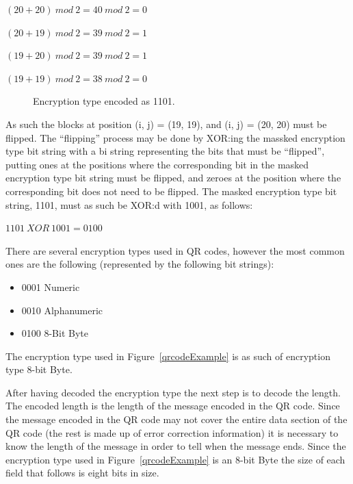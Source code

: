 \begin{center}

\((20+20)~mod~2=40~mod~2=0\)

\((20+19)~mod~2=39~mod~2=1\)

\((19+20)~mod~2=39~mod~2=1\)

\((19+19)~mod~2=38~mod~2=0\)

\end{center}

	\begin{figure}[H]%
		\centering
		\caption{Encryption type encoded as 1101.}
		\label{qrcodeExampleStep4}
	\end{figure}

As such the blocks at position (i, j) = (19, 19), and (i, j) = (20, 20) must be flipped. The ``flipping'' process may be done by XOR:ing the massked encryption type bit string with a bi string representing the bits that must be ``flipped'', putting ones at the positions where the corresponding bit in the masked encryption type bit string must be flipped, and zeroes at the position where the corresponding bit does not need to be flipped. The masked encryption type bit string, 1101, must as such be XOR:d with 1001, as follows:

\begin{center}
\(1101~XOR~1001=0100\)
\end{center}

There are several encryption types used in QR codes, however the most common ones are the following (represented by the following bit strings):

\begin{itemize}
	\item 0001 Numeric
	\item 0010 Alphanumeric
	\item 0100 8-Bit Byte
\end{itemize}

The encryption type used in Figure~\ref{qrcodeExample} is as such of encryption type 8-bit Byte.

After having decoded the encryption type the next step is to decode the length. The encoded length is the length of the message encoded in the QR code. Since the message encoded in the QR code may not cover the entire data section of the QR code (the rest is made up of error correction information) it is necessary to know the length of the message in order to tell when the message ends. Since the encryption type used in Figure~\ref{qrcodeExample} is an 8-bit Byte the size of each field that follows is eight bits in size.

